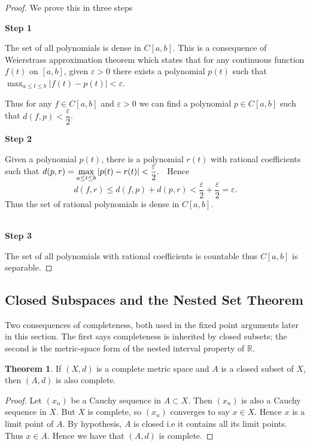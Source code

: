 \documentclass[11pt,a4paper]{article}
\theoremstyle{definition}
\newtheorem{thm}{Theorem}[section]
\newcommand{\subhead}[1]{%
  \par\medskip\noindent\textbf{#1}\par\nobreak\smallskip}
\begin{document}
\begin{proof}
We prove this in three steps

\subhead{Step 1}
The set of all polynomials is dense in $C[a,b]$. This is a consequence of Weierstrass approximation theorem which states that for any continuous function $f(t)$ on $[a,b]$, given $\varepsilon>0$ there exists a polynomial $p(t)$ such that \hspace{0.2cm}$\displaystyle{\max_{a\leq t\leq b}|f(t)-p(t)|<\varepsilon}.$

Thus for any $f\in C[a,b]$ and $\varepsilon>0$ we can find a polynomial $p\in C[a,b]$ such that $d(f,p)<\dfrac{\varepsilon}{2}$.

\subhead{Step 2}
Given a polynomial $p(t)$, there is a polynomial $r(t)$ with rational coefficients such that \hspace{0.3cm}$\displaystyle{d(p,r)=\max_{a\leq t\leq b}|p(t)-r(t)|<\frac{\varepsilon}{2}}.\hspace{0.2cm}$ Hence $$d(f,r)\leq d(f,p)+d(p,r)<\frac{\varepsilon}{2}+\frac{\varepsilon}{2}=\varepsilon.$$ Thus the set of rational polynomials is dense in $C[a,b]$.\\\\ 
\subhead{Step 3}
The set of all polynomials with rational coefficients is countable thus $C[a,b]$ is separable.

\end{proof}


\subsection{Closed Subspaces and the Nested Set Theorem}

Two consequences of completeness, both used in the fixed point arguments later
in this section. The first says completeness is inherited by closed subsets; the
second is the metric-space form of the nested interval property of
$\mathbb{R}$.


\begin{thm}
If $(X,d)$ is a complete metric space and $A$ is a closed subset of $X$, then $(A,d)$ is also complete.

\end{thm}

\begin{proof}
Let $(x_n)$ be a Cauchy sequence in $A\subset X$. Then $(x_n)$ is also a Cauchy sequence in $X$. But $X$ is complete, so $(x_n)$ converges to say $x\in X$. Hence $x$ is a limit point of $A$. By hypothesis, $A$ is closed i.e it contains all its limit points. Thus $x\in A$. Hence we have that $(A,d)$ is complete.

\end{proof}
\end{document}
